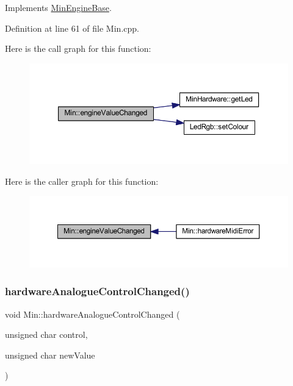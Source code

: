 Implements \hyperlink{class_min_engine_base_a35b19eb25b2bbfbcf0bc2262a63ec488}{Min\+Engine\+Base}.



Definition at line 61 of file Min.\+cpp.

Here is the call graph for this function\+:
\nopagebreak
\begin{figure}[H]
\begin{center}
\leavevmode
\includegraphics[width=350pt]{class_min_a9fe42a8d40c06d73556cf6d0dac2dc71_cgraph}
\end{center}
\end{figure}
Here is the caller graph for this function\+:
\nopagebreak
\begin{figure}[H]
\begin{center}
\leavevmode
\includegraphics[width=350pt]{class_min_a9fe42a8d40c06d73556cf6d0dac2dc71_icgraph}
\end{center}
\end{figure}
\mbox{\label{class_min_aead3e428133f75538420c1e67c532fa7}} 
\subsubsection{\texorpdfstring{hardware\+Analogue\+Control\+Changed()}{hardwareAnalogueControlChanged()}}
{\footnotesize\ttfamily void Min\+::hardware\+Analogue\+Control\+Changed (\begin{DoxyParamCaption}\item[{unsigned char}]{control,  }\item[{unsigned char}]{new\+Value }\end{DoxyParamCaption})\hspace{0.3cm}{\ttfamily [virtual]}}




